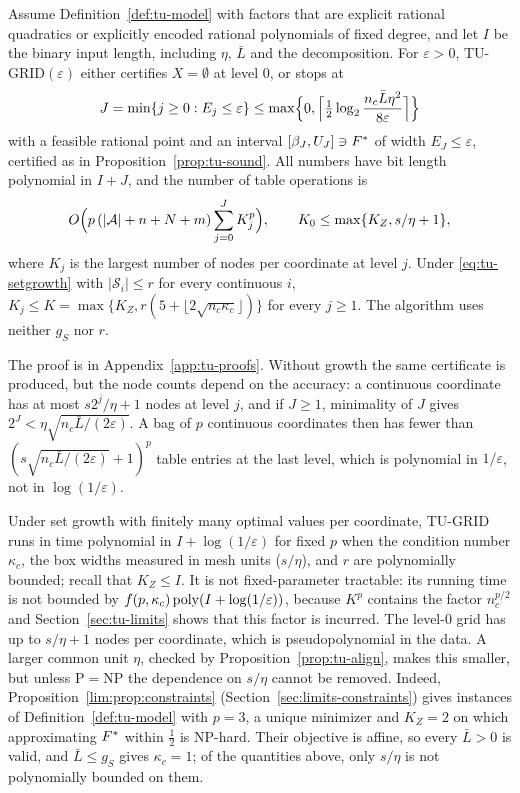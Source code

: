 \begin{theorem}\label{thm:tu-approx}
Assume Definition~\ref{def:tu-model} with factors that are explicit rational
quadratics or explicitly encoded rational polynomials of fixed degree, and
let $I$ be the binary input length, including $\eta$, $\bar L$ and the
decomposition. For $\varepsilon>0$, TU-GRID$(\varepsilon)$ either certifies
$X=\emptyset$ at level $0$, or stops at
\[
J=\min\{j\ge0:E_j\le\varepsilon\}\le
\max\Bigl\{0,\Bigl\lceil\tfrac12\log_2\frac{n_c\bar L\eta^2}{8\varepsilon}\Bigr\rceil\Bigr\}
\]
with a feasible rational point and an interval $[\beta_J,U_J]\ni F^{*}$ of width
$E_J\le\varepsilon$, certified as in Proposition~\ref{prop:tu-sound}. All
numbers have bit length polynomial in $I+J$, and the number of table
operations is
\[
O\Bigl(p\,(\lvert\mathcal A\rvert+n+N+m)\sum_{j=0}^JK_j^p\Bigr),\qquad
K_0\le\max\{K_Z,s/\eta+1\},
\]
where $K_j$ is the largest number of nodes per coordinate at level $j$.
Under \eqref{eq:tu-setgrowth} with $\lvert\mathcal S_i\rvert\le r$ for every
continuous $i$, $K_j\le K=\max\{K_Z,r(5+\lfloor2\sqrt{n_c\kappa_c}\rfloor)\}$
for every $j\ge1$. The algorithm uses neither $g_S$ nor $r$.
\end{theorem}

The proof is in Appendix~\ref{app:tu-proofs}. Without growth the same
certificate is produced, but the node counts depend on the accuracy: a
continuous coordinate has at most $s2^j/\eta+1$ nodes at level $j$, and if $J\ge1$, minimality of $J$ gives
$2^J<\eta\sqrt{n_c\bar L/(2\varepsilon)}$. A bag of $p$ continuous
coordinates then has fewer than $(s\sqrt{n_c\bar L/(2\varepsilon)}+1)^p$
table entries at the last level, which is polynomial in $1/\varepsilon$, not
in $\log(1/\varepsilon)$.

Under set growth with finitely many optimal values per coordinate, TU-GRID
runs in time polynomial in $I+\log(1/\varepsilon)$ for fixed $p$ when the
condition number $\kappa_c$, the box widths measured in mesh units
($s/\eta$), and $r$ are polynomially bounded; recall that $K_Z\le I$. It is
not fixed-parameter tractable: its running time is not bounded by
$f(p,\kappa_c)\operatorname{poly}(I+\log(1/\varepsilon))$, because $K^p$ contains the
factor $n_c^{p/2}$ and Section~\ref{sec:tu-limits} shows that this factor is
incurred. The level-$0$ grid has up to $s/\eta+1$ nodes per coordinate, which
is pseudopolynomial in the data. A larger common unit $\eta$, checked by
Proposition~\ref{prop:tu-align}, makes this smaller, but unless
$\mathrm P=\mathrm{NP}$ the dependence on $s/\eta$ cannot be removed.
Indeed, Proposition~\ref{lim:prop:constraints}
(Section~\ref{sec:limits-constraints}) gives instances of
Definition~\ref{def:tu-model} with $p=3$, a unique minimizer and $K_Z=2$ on
which approximating $F^{*}$ within $\frac12$ is NP-hard. Their objective is
affine, so every $\bar L>0$ is valid, and $\bar L\le g_S$ gives
$\kappa_c=1$; of the quantities above, only $s/\eta$ is not polynomially
bounded on them.

